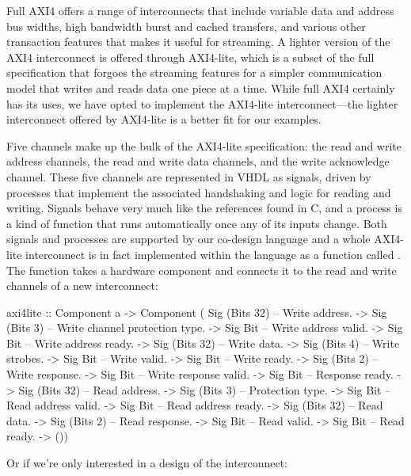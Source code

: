 \documentclass[../paper.tex]{subfiles}
\begin{document}
Full AXI4 offers a range of interconnects that include variable data and address bus widths, high bandwidth burst and cached transfers, and various other transaction features that makes it useful for streaming. A lighter version of the AXI4 interconnect is offered through AXI4-lite, which is a subset of the full specification that forgoes the streaming features for a simpler communication model that writes and reads data one piece at a time. While full AXI4 certainly has its uses, we have opted to implement the AXI4-lite interconnect---the lighter interconnect offered by AXI4-lite is a better fit for our examples.

Five channels make up the bulk of the AXI4-lite specification: the read and write address channels, the read and write data channels, and the write acknowledge channel. These five channels are represented in VHDL as signals, driven by processes that implement the associated handshaking and logic for reading and writing. Signals behave very much like the references found in C, and a process is a kind of function that runs automatically once any of its inputs change. Both signals and processes are supported by our co-design language and a whole AXI4-lite interconnect is in fact implemented within the language as a function called . The function takes a hardware component and connects it to the read and write channels of a new interconnect:

\begin{code}
axi4lite ::
     Component a
  -> Component (
          Sig (Bits 32) -- Write address.
       -> Sig (Bits 3)  -- Write channel protection type.
       -> Sig Bit       -- Write address valid.
       -> Sig Bit       -- Write address ready.
       -> Sig (Bits 32) -- Write data.
       -> Sig (Bits 4)  -- Write strobes.
       -> Sig Bit       -- Write valid.
       -> Sig Bit       -- Write ready.
       -> Sig (Bits 2)  -- Write response.
       -> Sig Bit       -- Write response valid.
       -> Sig Bit       -- Response ready.
       -> Sig (Bits 32) -- Read address.
       -> Sig (Bits 3)  -- Protection type.
       -> Sig Bit       -- Read address valid.
       -> Sig Bit       -- Read address ready.
       -> Sig (Bits 32) -- Read data.
       -> Sig (Bits 2)  -- Read response.
       -> Sig Bit       -- Read valid.
       -> Sig Bit       -- Read ready.    
       -> ())
\end{code}

\noindent Or if we're only interested in a design of the interconnect:
\end{document}
